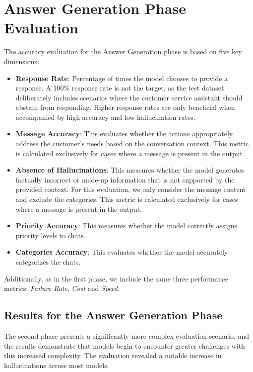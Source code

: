 \section{Answer Generation Phase Evaluation}
\label{sec:ag-eval}

The accuracy evaluation for the Answer Generation phase is based on five key dimensions:
\begin{itemize}
    \item \textbf{Response Rate}: Percentage of times the model chooses to provide a response. A 100\% response rate is not the target, as the test dataset deliberately includes scenarios where the customer service assistant should abstain from responding. Higher response rates are only beneficial when accompanied by high accuracy and low hallucination rates.
    \item \textbf{Message Accuracy}: This evaluates whether the actions appropriately address the customer's needs based on the conversation context. This metric is calculated exclusively for cases where a message is present in the output.
    \item \textbf{Absence of Hallucinations}: This measures whether the model generates factually incorrect or made-up information that is not supported by the provided context. For this evaluation, we only consider the message content and exclude the categories. This metric is calculated exclusively for cases where a message is present in the output.
    \item \textbf{Priority Accuracy}: This measures whether the model correctly assigns priority levels to chats.
    \item \textbf{Categories Accuracy}: This evaluates whether the model accurately categorizes the chats.
\end{itemize}
Additionally, as in the first phase, we include the same three performance metrics: \textit{Failure Rate}, \textit{Cost} and \textit{Speed}.

\subsection{Results for the Answer Generation Phase}
\label{sec:ag-results}

The second phase presents a significantly more complex evaluation scenario, and the results demonstrate that models begin to encounter greater challenges with this increased complexity.
The evaluation revealed a notable increase in hallucinations across most models.

